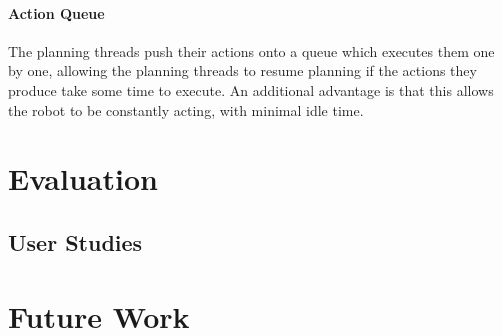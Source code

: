 \documentclass{article}
\begin{document}
\paragraph{Action Queue} The planning threads push their actions onto a queue which executes them one by one, allowing the planning threads to resume planning if the actions they produce take some time to execute. An additional advantage is that this allows the robot to be constantly acting, with minimal idle time. 

\section{Evaluation}

\subsection{User Studies}

\section{Future Work}
\end{document}
